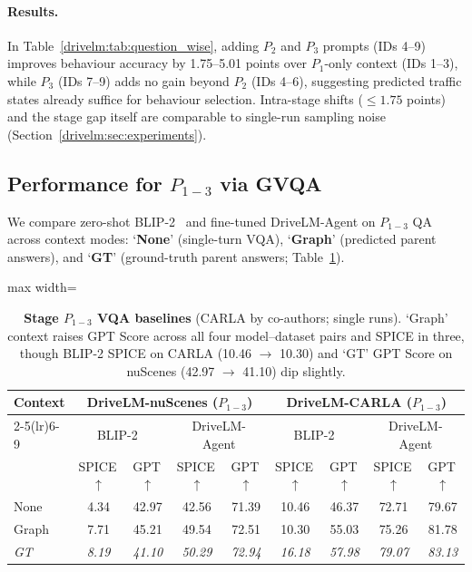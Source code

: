 \paragraph{Results.}
In Table~\ref{drivelm:tab:question_wise}, adding $P_2$ and $P_3$ prompts (IDs 4--9) improves behaviour accuracy by 1.75--5.01 points over $P_1$-only context (IDs 1--3), while $P_3$ (IDs 7--9) adds no gain beyond $P_2$ (IDs 4--6), suggesting predicted traffic states already suffice for behaviour selection. Intra-stage shifts ($\le 1.75$ points) and the stage gap itself are comparable to single-run sampling noise (Section~\ref{drivelm:sec:experiments}).

\subsection{Performance for \texorpdfstring{$P_{1-3}$}{P1-3} via GVQA}\label{drivelm:sec:exp_vqa}

We compare zero-shot BLIP-2~\cite{li2023blip2} and fine-tuned DriveLM-Agent on $P_{1-3}$ QA across context modes: `\textbf{None}' (single-turn VQA), `\textbf{Graph}' (predicted parent answers), and `\textbf{GT}' (ground-truth parent answers; Table~\ref{drivelm:tab:vqa}).

\begin{table}[t]
  \centering
  \caption[Stage $P_{1-3}$ VQA baselines]{\textbf{Stage $P_{1-3}$ VQA baselines} (CARLA by co-authors; single runs). `Graph' context raises GPT Score across all four model--dataset pairs and SPICE in three, though BLIP-2 SPICE on CARLA (10.46 $\rightarrow$ 10.30) and `GT' GPT Score on nuScenes (42.97 $\rightarrow$ 41.10) dip slightly.}
  \label{drivelm:tab:vqa}
  \begin{adjustbox}{max width=\textwidth}
  \begin{tabular}{l|cc|cc|cc|cc}
    \toprule
    \multirow{3}{*}{\textbf{Context}} & \multicolumn{4}{c|}{\textbf{DriveLM-nuScenes} ($P_{1-3}$)} & \multicolumn{4}{c}{\textbf{DriveLM-CARLA} ($P_{1-3}$)} \\
    \cmidrule(lr){2-5}\cmidrule(lr){6-9}
    & \multicolumn{2}{c|}{BLIP-2~\cite{li2023blip2}} & \multicolumn{2}{c|}{DriveLM-Agent} & \multicolumn{2}{c|}{BLIP-2~\cite{li2023blip2}} & \multicolumn{2}{c}{DriveLM-Agent} \\
    & SPICE\,$\uparrow$ & GPT\,$\uparrow$ & SPICE\,$\uparrow$ & GPT\,$\uparrow$ & SPICE\,$\uparrow$ & GPT\,$\uparrow$ & SPICE\,$\uparrow$ & GPT\,$\uparrow$ \\
    \midrule
    None & 4.34 & 42.97 & 42.56 & 71.39 & 10.46 & 46.37 & 72.71 & 79.67 \\
    Graph & 7.71 & 45.21 & 49.54 & 72.51 & 10.30 & 55.03 & 75.26 & 81.78 \\
    \midrule
    \textit{GT} & \textit{8.19} & \textit{41.10} & \textit{50.29} & \textit{72.94} & \textit{16.18} & \textit{57.98} & \textit{79.07} & \textit{83.13} \\
    \bottomrule
  \end{tabular}
  \end{adjustbox}
\end{table}

